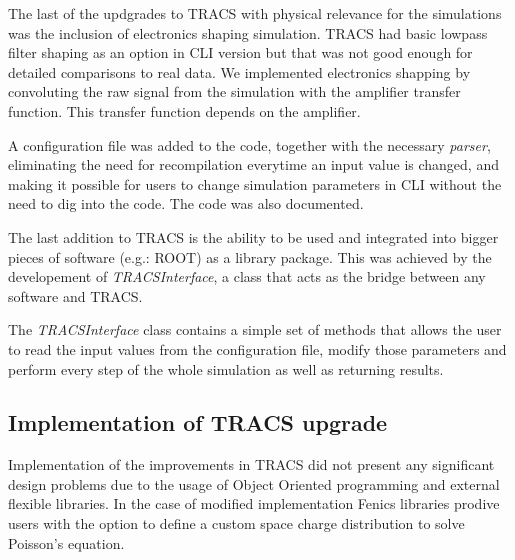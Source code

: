 The last of the updgrades to TRACS with physical relevance for the simulations was the inclusion of electronics shaping simulation. TRACS had basic lowpass filter shaping as an option in CLI version but that was not good enough for detailed comparisons to real data. We implemented electronics shapping by convoluting the raw signal from the simulation with the amplifier transfer function. This transfer function depends  on the amplifier.



A configuration file was added to the code, together with the necessary \textit{parser}, eliminating the need for recompilation everytime an input value is changed, and making it possible for users to change simulation parameters in CLI without the need to dig into the code. The code was also documented.

The last addition to TRACS is the ability to be used and integrated into bigger pieces of software (e.g.: ROOT) as a library package. This was achieved by the developement of \textit{TRACSInterface}, a class that acts as the bridge between any software and TRACS.

The \textit{TRACSInterface} class contains a simple set of methods that allows the user to read the input values from the configuration file, modify those parameters and perform every step of the whole simulation as well as returning results.

\subsection{Implementation of TRACS upgrade}

Implementation of the improvements in TRACS did not present any significant design problems due to the usage of Object Oriented programming and external flexible libraries. In the case of modified \neff implementation Fenics libraries prodive users with the option to define a custom space charge distribution to solve Poisson's equation. 

